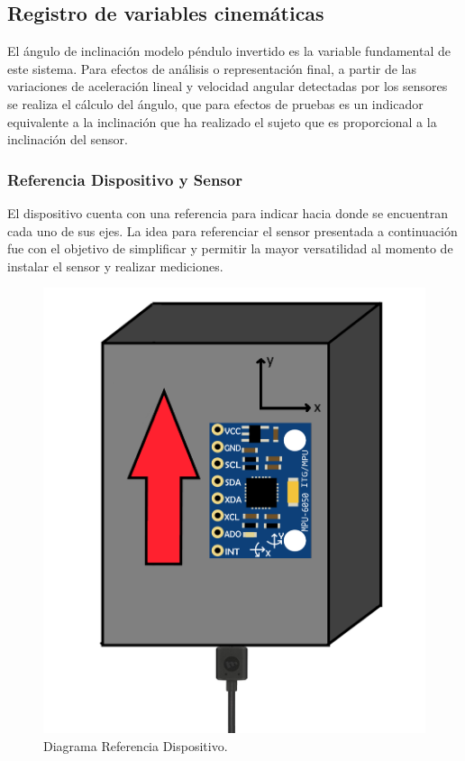 \documentclass[12pt,a4paper]{article}
\begin{document}
\newpage
\subsection{Registro de variables cinemáticas}
El ángulo de inclinación modelo péndulo invertido\cite{gage_kinematic_2004} es la variable fundamental de este sistema.
Para efectos de análisis o representación final, a partir de las variaciones de aceleración lineal y velocidad angular detectadas por los sensores se realiza el cálculo del ángulo, que para efectos de pruebas es un indicador equivalente a la inclinación que ha realizado el sujeto que es proporcional a la inclinación del sensor.

\subsubsection{Referencia Dispositivo y Sensor}
El dispositivo cuenta con una referencia para indicar hacia donde se encuentran cada uno de sus ejes. La idea para referenciar el sensor presentada a continuación fue con el objetivo de simplificar y permitir la mayor versatilidad al momento de instalar el sensor y realizar mediciones.

\begin{figure}[H]
	\centering
	\includegraphics[scale=0.2]{images/referenciaDispositivo}
	\caption{Diagrama Referencia Dispositivo.}
	\label{fig:referenciaDisp}
\end{figure}
\end{document}

